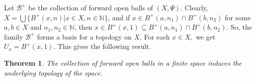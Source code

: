 \documentclass[12pt]{amsart}
\newtheorem{theorem}[definition]{Theorem}
\begin{document}
Let $\mathcal{B}^+$ be the collection of forward open balls of $(X,\Psi)$. Clearly, $X=\bigcup\{B^+(x,n)
|x\in X, n\in \mathbb{N}\}$, and if $x\in B^+(a,n_1)\cap B^+(b,n_2)$ for some $a,b\in X$ and $n_1,n_2\in\mathbb{N}$, then $x\in B^+(x,1)\subseteq B^+(a,n_1)\cap B^+(b,n_2).$ So, the family $\mathcal{B}^+$ forms a basis for a topology on $X$. For each $x\in X,$ we get $U_x=B^+(x,1).$ This gives the following result. 


\begin{theorem}
	The collection %
	of forward open balls in a finite space induces the underlying topology of the space.
\end{theorem}

\end{document}
